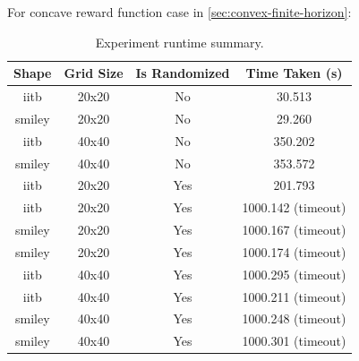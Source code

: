 \documentclass{article}
\newcommand{\ak}[1]{\textcolor{red}{ak: #1}}
\newcommand{\bk}[1]{\textcolor{blue}{: #1}}
\begin{document}
For concave reward function case in \ref{sec:convex-finite-horizon}:

\begin{table}[h]
\centering
\caption{Experiment runtime summary.}
\label{tab:experiment-runtime-summary}
\begin{tabular}{cccc}
\toprule
Shape & Grid Size & Is Randomized & Time Taken (s) \\
\midrule
iitb   & 20x20 & No  & 30.513 \\
smiley & 20x20 & No  & 29.260 \\
iitb   & 40x40 & No  & 350.202 \\
smiley & 40x40 & No  & 353.572 \\
iitb   & 20x20 & Yes & 201.793 \\
iitb   & 20x20 & Yes & 1000.142 (timeout) \\
smiley & 20x20 & Yes & 1000.167 (timeout) \\
smiley & 20x20 & Yes & 1000.174 (timeout) \\
iitb   & 40x40 & Yes & 1000.295 (timeout) \\
iitb   & 40x40 & Yes & 1000.211 (timeout) \\
smiley & 40x40 & Yes & 1000.248 (timeout) \\
smiley & 40x40 & Yes & 1000.301 (timeout) \\
\bottomrule
\end{tabular}
\end{table}









 


% 


\end{document}
